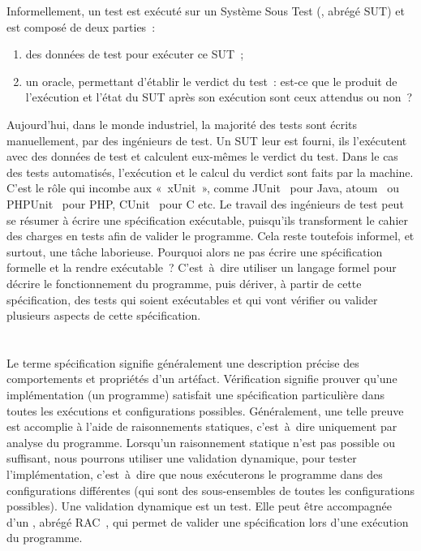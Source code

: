 Informellement, un test est exécuté sur un Système Sous Test (, abrégé {\strong SUT}) et est composé de deux parties~:
%
\begin{enumerate}

\item des {\strong données de test} pour exécuter ce SUT~;

\item un {\strong oracle}, permettant d'établir le verdict du test~: est-ce que
le produit de l'exécution et l'état du SUT après son exécution sont ceux
attendus ou non~?

\end{enumerate}

Aujourd'hui, dans le monde industriel, la majorité des tests sont écrits
{\strong manuellement}, par des ingénieurs de test. Un SUT leur est fourni, ils
l'exécutent avec des données de test et calculent eux-mêmes le verdict du test.
Dans le cas des tests {\strong automatisés}, l'exécution et le calcul du verdict
sont faits par la machine. C'est le rôle qui incombe aux 
«~xUnit~», comme JUnit~ pour Java, atoum~ ou
PHPUnit~ pour PHP, CUnit~ pour C etc. Le travail des
ingénieurs de test peut se résumer à écrire une spécification exécutable,
puisqu'ils transforment le cahier des charges en tests afin de valider le
programme. Cela reste toutefois informel, et surtout, une tâche laborieuse.
Pourquoi alors ne pas écrire une spécification formelle et la rendre
exécutable~? C'est~à~dire utiliser un langage formel pour décrire le
fonctionnement du programme, puis dériver, à partir de cette spécification, des
tests qui soient exécutables et qui vont vérifier ou valider plusieurs aspects
de cette spécification.

\section{}

Le terme {\strong spécification} signifie généralement une description précise
des comportements et propriétés d'un artéfact. {\strong Vérification} signifie
prouver qu'une implémentation (un programme) satisfait une spécification
particulière dans toutes les exécutions et configurations possibles.
Généralement, une telle preuve est accomplie à l'aide de raisonnements
statiques, c'est~à~dire uniquement par analyse du programme. Lorsqu'un
raisonnement statique n'est pas possible ou suffisant, nous pourrons utiliser
une {\strong validation} dynamique, pour tester l'implémentation, c'est~à~dire
que nous exécuterons le programme dans des configurations différentes (qui sont
des sous-ensembles de toutes les configurations possibles). Une validation
dynamique est un test. Elle peut être accompagnée d'un , abrégé RAC~, qui permet de valider une
spécification lors d'une exécution du programme.

